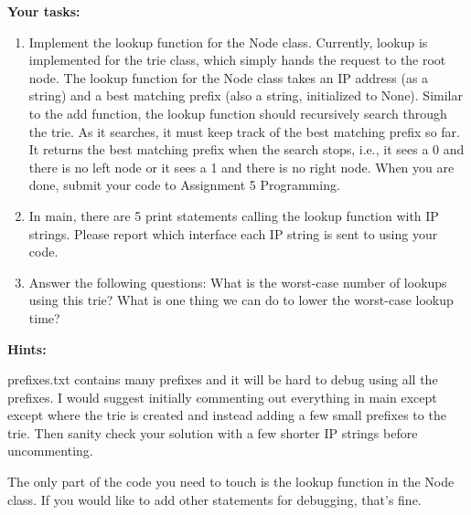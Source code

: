 \documentclass[10pt]{article}
\newenvironment{problem}[2][Problem]{\begin{trivlist}
\item[\hskip \labelsep {\bfseries #1}\hskip \labelsep {\bfseries #2.}]}{\end{trivlist}}
\begin{document}
\begin{problem}{1: Trie to Return the Correct Interface}
\begin{enumerate}
\textbf{Your tasks:}
\begin{enumerate}
    \item Implement the lookup function for the Node class. Currently, lookup is implemented for the trie class, which simply hands the request to the root node. The lookup function for the Node class takes an IP address (as a string) and a best matching prefix (also a string, initialized to None). Similar to the add function, the lookup function should recursively search through the trie. As it searches, it must keep track of the best matching prefix so far. It returns the best matching prefix when the search stops, i.e., it sees a 0 and there is no left node or it sees a 1 and there is no right node. When you are done, submit your code to Assignment 5 Programming.
    \item In main, there are 5 print statements calling the lookup function with IP strings. Please report which interface each IP string is sent to using your code.
    \item Answer the following questions: What is the worst-case number of lookups using this trie? What is one thing we can do to lower the worst-case lookup time?
\end{enumerate}

\textbf{Hints:} 

prefixes.txt contains many prefixes and it will be hard to debug using all the prefixes. I would suggest initially commenting out everything in main except except where the trie is created and instead adding a few small prefixes to the trie. Then sanity check your solution with a few shorter IP strings before uncommenting. 

The only part of the code you need to touch is the lookup function in the Node class. If you would like to add other statements for debugging, that's fine.


\end{enumerate}
\end{problem}
\end{document}
